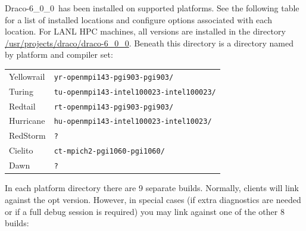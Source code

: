 \documentclass[note]{ResearchNote}
\newcommand{\draco}{Draco}
\newcommand{\dracor}{\draco-6\_0\_0}
\begin{document}
\dracor\ has been installed on supported platforms.  See the following
table for a list of installed locations and configure options
associated with each location.  For LANL HPC machines, all versions
are installed in the directory \url{/usr/projects/draco/draco-6_0_0}.
Beneath this directory is a directory named by platform and compiler
set:
%
\begin{center}
  \footnotesize
  \begin{tabular}{lp{2.5in}}
    \hline\hline
    \textsf{Yellowrail} & \texttt{yr-openmpi143-pgi903-pgi903/}  \\
    \textsf{Turing}     & \texttt{tu-openmpi143-intel100023-intel100023/}  \\
    \textsf{Redtail}    & \texttt{rt-openmpi143-pgi903-pgi903/}  \\
    \textsf{Hurricane}  & \texttt{hu-openmpi143-intel100023-intel10023/}  \\
    \textsf{RedStorm }  & \texttt{?}  \\
    \textsf{Cielito}    & \texttt{ct-mpich2-pgi1060-pgi1060/}  \\
    \textsf{Dawn}       & \texttt{?}  \\
    \hline\hline
  \end{tabular}
\end{center}
%
In each platform directory there are 9 separate builds.  Normally,
clients will link against the \textsf{opt} version.  However, in
special cases (if extra diagnostics are needed or if a full debug
session is required) you may link against one of the other 8 builds:
%
\end{document}
